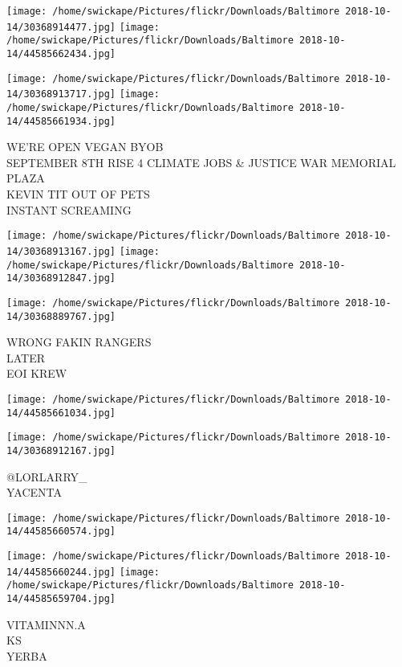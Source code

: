 \documentclass[10pt,letterpaper]{article}
\begin{document}
\texttt{[image: /home/swickape/Pictures/flickr/Downloads/Baltimore 2018-10-14/30368914477.jpg]}
\texttt{[image: /home/swickape/Pictures/flickr/Downloads/Baltimore 2018-10-14/44585662434.jpg]}

\texttt{[image: /home/swickape/Pictures/flickr/Downloads/Baltimore 2018-10-14/30368913717.jpg]}
\texttt{[image: /home/swickape/Pictures/flickr/Downloads/Baltimore 2018-10-14/44585661934.jpg]}

WE'RE OPEN VEGAN BYOB\\
SEPTEMBER 8TH RISE 4 CLIMATE JOBS \& JUSTICE WAR MEMORIAL PLAZA\\
KEVIN TIT OUT OF PETS\\
INSTANT SCREAMING\\
\pagebreak

\texttt{[image: /home/swickape/Pictures/flickr/Downloads/Baltimore 2018-10-14/30368913167.jpg]}
\texttt{[image: /home/swickape/Pictures/flickr/Downloads/Baltimore 2018-10-14/30368912847.jpg]}

\texttt{[image: /home/swickape/Pictures/flickr/Downloads/Baltimore 2018-10-14/30368889767.jpg]}

WRONG FAKIN RANGERS\\
LATER\\
EOI KREW\\
\pagebreak

\texttt{[image: /home/swickape/Pictures/flickr/Downloads/Baltimore 2018-10-14/44585661034.jpg]}

\vspace{0.25in}
\texttt{[image: /home/swickape/Pictures/flickr/Downloads/Baltimore 2018-10-14/30368912167.jpg]}

@LORLARRY\_\\
YACENTA\\
\pagebreak

\texttt{[image: /home/swickape/Pictures/flickr/Downloads/Baltimore 2018-10-14/44585660574.jpg]}

\vspace{0.25in}
\texttt{[image: /home/swickape/Pictures/flickr/Downloads/Baltimore 2018-10-14/44585660244.jpg]}
\texttt{[image: /home/swickape/Pictures/flickr/Downloads/Baltimore 2018-10-14/44585659704.jpg]}

VITAMINNN.A\\
KS\\
YERBA\\
\pagebreak
\end{document}
